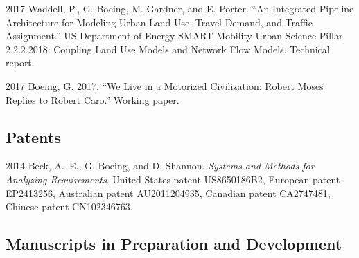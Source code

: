 \documentclass{academiccv}
\begin{document}
\begin{tablist}
	
\item[2017] \tab Waddell, P., G. Boeing, M. Gardner, and E. Porter. \enquote{An Integrated Pipeline Architecture for Modeling Urban Land Use, Travel Demand, and Traffic Assignment.} US Department of Energy SMART Mobility Urban Science Pillar 2.2.2.2018: Coupling Land Use Models and Network Flow Models. Technical report.

\item[2017] \tab Boeing, G. 2017. \enquote{We Live in a Motorized Civilization: Robert Moses Replies to Robert Caro.} Working paper.
	
\end{tablist}



\subsection*{Patents}

\begin{tablist}

\item[2014] \tab Beck, A.~E., G. Boeing, and D. Shannon. \emph{Systems and Methods for Analyzing Requirements}. United States patent US8650186B2, European patent EP2413256, Australian patent AU2011204935, Canadian patent CA2747481, Chinese patent CN102346763.

\end{tablist}



\subsection*{Manuscripts in Preparation and Development}
\end{document}
